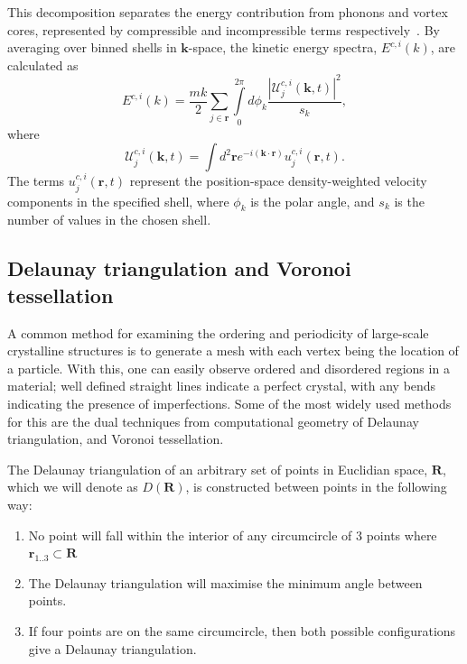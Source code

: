 This decomposition separates the energy contribution from phonons and vortex cores, represented by compressible and incompressible terms respectively~\cite{CT:Horng_pra_2009}. By averaging over binned shells in $\mathbf{k}$-space, the kinetic energy spectra, $E^{c,i}(k)$, are calculated as~\cite{CT:Bradley_prx_2012}
\begin{equation}
	E^{c,i}(k) = \frac{mk}{2}\sum\limits_{j\in\mathbf{r}} \int\limits_{0}^{2\pi}d\phi_k \frac{ |\mathcal{U}_j^{c,i}(\mathbf{k},t) |^2}{s_k},
\end{equation}
where
\begin{equation}
	\mathcal{U}_j^{c,i}(\mathbf{k},t) = \int d^2 \mathbf{r} e^{-i(\mathbf{k}\cdot\mathbf{r})} u_j^{c,i}(\mathbf{r},t).
\end{equation}
The terms $u_j^{c,i}(\mathbf{r},t)$ represent the position-space density-weighted velocity components in the specified shell, where $\phi_k$ is the polar angle, and $s_k$ is the number of values in the chosen shell.

\subsection{Delaunay triangulation and Voronoi tessellation}\label{sec:delaunay}
A common method for examining the ordering and periodicity of large-scale crystalline structures is to generate a mesh with each vertex being the location of a particle. With this, one can easily observe ordered and disordered regions in a material; well defined straight lines indicate a perfect crystal, with any bends indicating the presence of imperfections. Some of the most widely used methods for this are the dual techniques from computational geometry of Delaunay triangulation, and Voronoi tessellation.

The Delaunay triangulation of an arbitrary set of points in Euclidian space, $\mathbf{R}$, which we will denote as $D(\mathbf{R})$, is constructed between points in the following way:
\begin{enumerate}
    \item No point will fall within the interior of any circumcircle of 3 points where $\mathbf{r}_{1..3} \subset \mathbf{R}$
    \item The Delaunay triangulation will maximise the minimum angle between points.
    \item If four points are on the same circumcircle, then both possible configurations give a Delaunay triangulation.
\end{enumerate}

